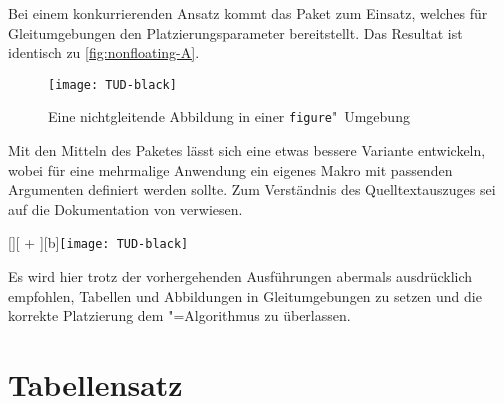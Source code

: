 \documentclass[%
  english,ngerman,%
  cdgeometry=no,DIV=12,%
  cd=false,cdfont=false,cdtitle=true,%
  headings=normal,%
  automark,%
  listof=toc,%
]{tudscrartcl}
\begin{document}
Bei einem konkurrierenden Ansatz kommt das Paket  zum Einsatz, 
welches für Gleitumgebungen den Platzierungsparameter  
bereitstellt. Das Resultat ist identisch zu \autoref{fig:nonfloating-A}.
%
\begin{Hint}
\begin{figure}[H]
\texttt{[image: TUD-black]}
\caption{%
  Eine nichtgleitende Abbildung in einer \texttt{figure}"~Umgebung%
  \label{fig:nonfloating-B}%
}
\end{figure}

\end{Hint}
%
Mit den Mitteln des Paketes  lässt sich eine etwas bessere 
Variante entwickeln, wobei für eine mehrmalige Anwendung ein eigenes Makro mit 
passenden Argumenten definiert werden sollte. Zum Verständnis des 
Quelltextauszuges sei auf die Dokumentation von  verwiesen.
%
\begin{Hint}
[\FBwidth][%
  \dimexpr\FBheight+\abovedisplayskip\relax%
][b]{\texttt{[image: TUD-black]}}{%
  \caption{%
    Eine nichtgleitende Abbildung mit \texttt{\textbackslash floatbox}%
    \label{fig:nonfloating-C}%
  }%
}
\end{Hint}
\InputCode\noindent
%
Es wird hier trotz der vorhergehenden Ausführungen abermals ausdrücklich 
empfohlen, Tabellen und Abbildungen in Gleitumgebungen zu setzen und die 
korrekte Platzierung dem "=Algorithmus zu überlassen.



\section{%
  Tabellensatz%
  \label{sec:tables}%
}
\end{document}

